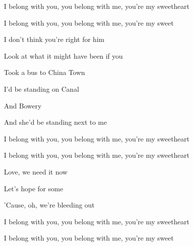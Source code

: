 \begin{song}
\bigskip

I belong with you, you belong with me, you're my sweetheart \par
I belong with you, you belong with me, you're my sweet \par

\bigskip

    \par
{}    \par

\bigskip

 I don't think you're right for him  \par
{} Look at what it might have been if you  \par
{} Took a bus to China Town  \par
{} I'd be standing on Canal  \par
{} And Bowery  \par
{} And she'd be standing next to me  \par

\bigskip

I belong with you, you belong with me, you're my sweetheart \par
I belong with you, you belong with me, you're my sweetheart \par

\bigskip

Love, we need it now \par
Let's hope for some \par
'Cause, oh, we're bleeding out \par

\bigskip

I belong with you, you belong with me, you're my sweetheart \par
I belong with you, you belong with me, you're my sweet \par

\bigskip

    \par
{}   \par

\end{song}
